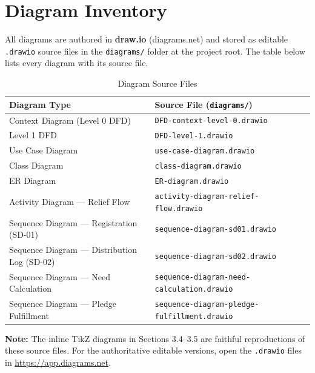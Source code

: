 
\section{Diagram Inventory}
All diagrams are authored in \textbf{draw.io} (diagrams.net) and stored as editable \texttt{.drawio} source files in the \texttt{diagrams/} folder at the project root.  The table below lists every diagram with its source file.

\begin{table}[H]
\centering
\caption{Diagram Source Files}
\label{tab:diagrams}
\begin{tabularx}{\textwidth}{@{}lX@{}}
\toprule
Diagram Type & Source File (\texttt{diagrams/}) \\
\midrule
Context Diagram (Level 0 DFD) & \texttt{DFD-context-level-0.drawio} \\
Level 1 DFD & \texttt{DFD-level-1.drawio} \\
Use Case Diagram & \texttt{use-case-diagram.drawio} \\
Class Diagram & \texttt{class-diagram.drawio} \\
ER Diagram & \texttt{ER-diagram.drawio} \\
Activity Diagram --- Relief Flow & \texttt{activity-diagram-relief-flow.drawio} \\
Sequence Diagram --- Registration (SD-01) & \texttt{sequence-diagram-sd01.drawio} \\
Sequence Diagram --- Distribution Log (SD-02) & \texttt{sequence-diagram-sd02.drawio} \\
Sequence Diagram --- Need Calculation & \texttt{sequence-diagram-need-calculation.drawio} \\
Sequence Diagram --- Pledge Fulfillment & \texttt{sequence-diagram-pledge-fulfillment.drawio} \\
\bottomrule
\end{tabularx}
\end{table}

\noindent\textbf{Note:} The inline TikZ diagrams in Sections 3.4--3.5 are faithful reproductions of these source files.  For the authoritative editable versions, open the \texttt{.drawio} files in \url{https://app.diagrams.net}.

